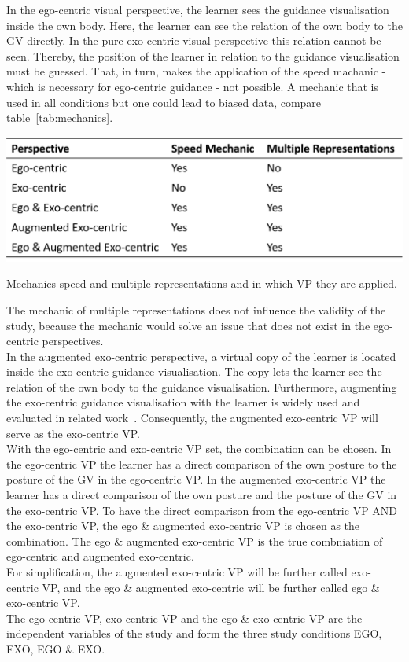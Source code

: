 In the ego-centric visual perspective, the learner sees the guidance visualisation inside the own body. Here, the learner can see the relation of the own body to the GV directly. In the pure exo-centric visual perspective this relation cannot be seen. Thereby, the position of the learner in relation to the guidance visualisation must be guessed. That, in turn, makes the application of the speed machanic - which is necessary for ego-centric guidance - not possible. A mechanic that is used in all conditions but one could lead to biased data, compare table~\ref{tab:mechanics}.
\begin{table}[htb]
	\centering
	\includegraphics[width=\textwidth]{figures/mechanics_comparison.png}
	\caption[Mechanics for Motor Learing in Virtual Reality]{Mechanics speed and multiple representations and in which VP they are applied.}
	\label{tab:mechanics}
\end{table}
The mechanic of multiple representations does not influence the validity of the study, because the mechanic would solve an issue that does not exist in the ego-centric perspectives.\\
In the augmented exo-centric perspective, a virtual copy of the learner is located inside the exo-centric guidance visualisation. The copy lets the learner see the relation of the own body to the guidance visualisation. Furthermore, augmenting the exo-centric guidance visualisation with the learner is widely used and evaluated in related work~\cite{YouMove,thaichichua}. Consequently, the augmented exo-centric VP will serve as the exo-centric VP.\\
With the ego-centric and exo-centric VP set, the combination can be chosen. In the ego-centric VP the learner has a direct comparison of the own posture to the posture of the GV in the ego-centric VP. In the augmented exo-centric VP the learner has a direct comparison of the own posture and the posture of the GV in the exo-centric VP. To have the direct comparison from the ego-centric VP AND the exo-centric VP, the ego \& augmented exo-centric VP is chosen as the combination. The ego \& augmented exo-centric VP is the true combniation of ego-centric and augmented exo-centric.\\
For simplification, the augmented exo-centric VP will be further called exo-centric VP, and the ego \& augmented exo-centric will be further called ego \& exo-centric VP.\\
The ego-centric VP, exo-centric VP and the ego \& exo-centric VP are the independent variables of the study and form the three study conditions EGO, EXO, EGO \& EXO.

